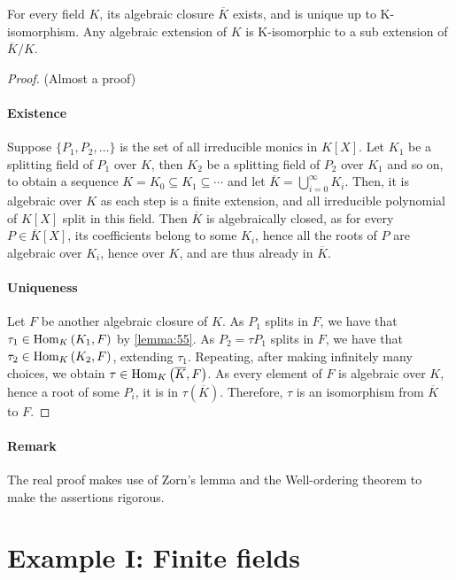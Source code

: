 \begin{theorem}
  \label{thm:58}
  For every field $K$, its algebraic closure $\overline{K}$ exists, and is unique up to K-isomorphism. Any algebraic extension of $K$ is K-isomorphic to a sub extension of $\overline{K}/K$.
\end{theorem}

\begin{proof}
  (Almost a proof)

\paragraph{Existence}

Suppose $\{ P_1, P_2, \ldots \}$ is the set of all irreducible monics in $K[X]$. Let $K_1$ be a splitting field of $P_1$ over $K$, then $K_2$ be a splitting field of $P_2$ over $K_1$ and so on, to obtain a sequence $K = K_0 \subseteq K_1 \subseteq \cdots$ and let $\overline{K} = \bigcup_{i=0}^\infty K_i$. Then, it is algebraic over $K$ as each step is a finite extension, and all irreducible polynomial of $K[X]$ split in this field. Then $\overline{K}$ is algebraically closed, as for every $P \in \overline{K}[X]$, its coefficients belong to some $K_i$, hence all the roots of $P$ are algebraic over $K_i$, hence over $K$, and are thus already in $\overline{K}$.

\paragraph{Uniqueness}

Let $F$ be another algebraic closure of $K$. As $P_1$ splits in $F$, we have that $\tau_1 \in \text{Hom}_{K}\left(K_1, F\right)$ by \autoref{lemma:55}. As $P_2 = \tau{}P_1$ splits in $F$, we have that $\tau_2 \in \text{Hom}_{K}\left(K_2, F\right)$, extending $\tau_1$. Repeating, after making infinitely many choices, we obtain $\tau \in \text{Hom}_{K}\left(\overline{K}, F\right)$. As every element of $F$ is algebraic over $K$, hence a root of some $P_i$, it is in $\tau(\overline{K})$. Therefore, $\tau$ is an isomorphism from $\overline{K}$ to $F$.
\end{proof}

\paragraph{Remark}

The real proof makes use of Zorn's lemma and the Well-ordering theorem to make the assertions rigorous.

\section{Example I: Finite fields}

